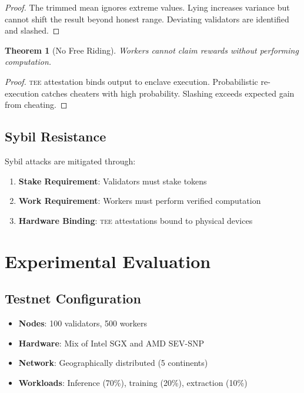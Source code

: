 \documentclass[11pt,letterpaper]{article}
\newtheorem{theorem}{Theorem}[section]
\newcommand{\TEE}{\textsc{tee}}
\begin{document}
\begin{proof}
The trimmed mean ignores extreme values. Lying increases variance but cannot shift the result beyond honest range. Deviating validators are identified and slashed.
\end{proof}

\begin{theorem}[No Free Riding]
Workers cannot claim rewards without performing computation.
\end{theorem}

\begin{proof}
\TEE{} attestation binds output to enclave execution. Probabilistic re-execution catches cheaters with high probability. Slashing exceeds expected gain from cheating.
\end{proof}

\subsection{Sybil Resistance}

Sybil attacks are mitigated through:
\begin{enumerate}
    \item \textbf{Stake Requirement}: Validators must stake tokens
    \item \textbf{Work Requirement}: Workers must perform verified computation
    \item \textbf{Hardware Binding}: \TEE{} attestations bound to physical devices
\end{enumerate}

\section{Experimental Evaluation}
\label{sec:evaluation}

\subsection{Testnet Configuration}

\begin{itemize}
    \item \textbf{Nodes}: 100 validators, 500 workers
    \item \textbf{Hardware}: Mix of Intel SGX and AMD SEV-SNP
    \item \textbf{Network}: Geographically distributed (5 continents)
    \item \textbf{Workloads}: Inference (70\%), training (20\%), extraction (10\%)
\end{itemize}
\end{document}
